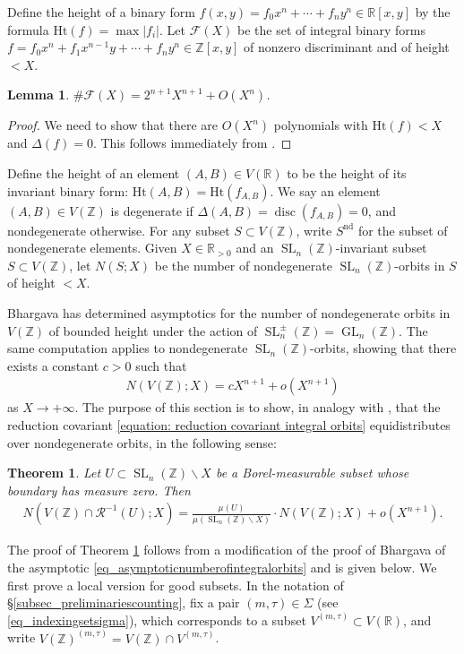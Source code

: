 \documentclass{article} %
\newtheorem{theorem}[proposition]{Theorem}
\newtheorem{lemma}[proposition]{Lemma}
\numberwithin{equation}{section}
\DeclareMathOperator{\GL}{GL}
\DeclareMathOperator{\SL}{SL}
\newcommand{\R}{\mathbb{R}}
\newcommand{\Z}{\mathbb{Z}}
\newcommand{\height}{\mathrm{Ht}}
\DeclareMathOperator{\disc}{disc}
\begin{document}
Define the height of a binary form $f(x,y) = f_0x^n + \cdots + f_n y^n\in \R[x,y]$ by the formula $\height(f) = \max |f_i|$.
Let $\mathcal{F}(X)$ be the set of integral binary forms $f = f_0x^{n} + f_1x^{n-1}y + \cdots + f_{n}y^n \in \Z[x,y]$ of nonzero discriminant and of height $<X$. 
\begin{lemma}\label{lemma_F(X)_expectedsize}
    $\# \mathcal{F}(X) = 2^{n+1} X^{n+1} + O(X^{n})$.
\end{lemma}
\begin{proof}
    We need to show that there are $O(X^{n})$ polynomials with $\height(f) < X$ and $\Delta(f) = 0$. This follows immediately from \cite[Lemma 3.1]{bhargava2014geometric}.
\end{proof}

Define the height of an element $(A,B)\in V(\R)$ to be the height of its invariant binary form: $\height(A,B) = \height(f_{A,B})$.
We say an element $(A,B)\in V(\Z)$ is degenerate if $\Delta(A,B) = \disc(f_{A,B})=0$, and nondegenerate otherwise.
For any subset $S\subset V(\Z)$, write $S^{\text{nd}}$ for the subset of nondegenerate elements.
Given $X\in \R_{> 0}$ and an $\SL_n(\Z)$-invariant subset $S\subset V(\Z)$, let $N(S;X)$ be the number of nondegenerate $\SL_n(\Z)$-orbits in $S$ of height $< X$.

Bhargava \cite[\S4,Theorem 8]{bhargava2015mosthyperellipticarepointless} has determined asymptotics for the number of nondegenerate orbits in $V(\Z)$ of bounded height under the action of $\SL_n^{\pm}(\Z) = \GL_n(\Z)$.
The same computation applies to nondegenerate $\SL_n(\Z)$-orbits, showing that there exists a constant $c>0$ such that 
\begin{align}\label{eq_asymptoticnumberofintegralorbits}
    N(V(\Z);X) = c X^{n+1} + o(X^{n+1})
\end{align}
as $X\rightarrow +\infty$.
The purpose of this section is to show, in analogy with \cite[Theorem 3.8]{lagathorne2024smallheightoddhyperelliptic}, that the reduction covariant \eqref{equation: reduction covariant integral orbits} equidistributes over nondegenerate orbits, in the following sense:



\begin{theorem}\label{theorem: equidistribution reduction covariant}
    Let $U\subset \SL_n(\Z)\backslash X$ be a Borel-measurable subset whose boundary has measure zero.
    Then 
    \begin{align*}
        N(V(\Z)\cap \mathcal{R}^{-1}(U); X) = \frac{\mu(U)}{\mu(\SL_n(\Z)\backslash X) }\cdot N(V(\Z);X)+ o(X^{n+1}).
    \end{align*}
\end{theorem}
The proof of Theorem \ref{theorem: equidistribution reduction covariant} follows from a modification of the proof of Bhargava of the asymptotic \eqref{eq_asymptoticnumberofintegralorbits} and is given below.
We first prove a local version for good subsets.
In the notation of \S\ref{subsec_preliminariescounting}, fix a pair $(m,\tau)\in \Sigma$ (see \eqref{eq_indexingsetsigma}), which corresponds to a subset $V^{(m,\tau)}\subset V(\R)$, and write $V(\Z)^{(m,\tau)} = V(\Z) \cap V^{(m,\tau)}$.
\end{document}
